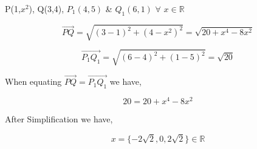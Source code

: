 

P(1,$x^2$), Q(3,4), $P_1(4,5)$ \& $Q_1(6,1)$ $\forall$ $ x \in \mathbb{R}$

$$\overrightarrow{PQ} = \sqrt{(3 - 1)^2 + (4 - x^2)^2} = \sqrt{20 + x^4 -8x^2}$$

$$\overrightarrow{P_{1}Q_{1}} = \sqrt{(6 - 4)^2 + (1 - 5)^2} = \sqrt{20}$$

When equating $\overrightarrow{PQ} = \overrightarrow{P_{1}Q_{1}}$ we have,

$$20 = 20 + x^4 - 8x^2$$

After Simplification we have,

$$x = \{-2\sqrt{2}, 0, 2\sqrt{2}\} \in \mathbb{R}$$
